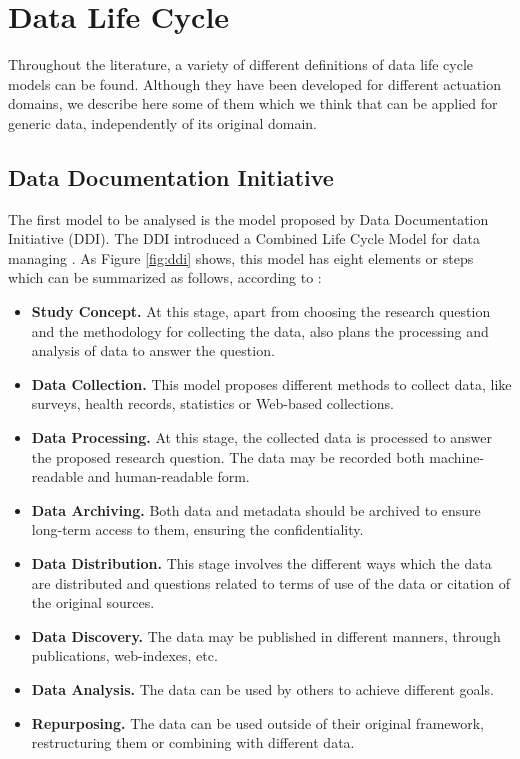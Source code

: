 \section{Data Life Cycle}

Throughout the literature, a variety of different definitions of data life cycle models can be found. Although they have been developed for different actuation domains, we describe here some of them which we think that can be applied for generic data, independently of its original domain.

\subsection{Data Documentation Initiative}

The first model to be analysed is the model proposed by Data Documentation Initiative (DDI). The DDI introduced a Combined Life Cycle Model for data managing \cite{data_documentation_initiative_overview_2008}. As Figure \ref{fig:ddi} shows, this model has eight elements or steps which can be summarized as follows, according to \cite{ball_review_2012}:

\begin{itemize}
    \item \textbf{Study Concept.} At this stage, apart from choosing the research question and the methodology for collecting the data, also plans the processing and analysis of data to answer the question.
    \item \textbf{Data Collection.} This model proposes different methods to collect data, like surveys, health records, statistics or Web-based collections.
    \item \textbf{Data Processing.} At this stage, the collected data is processed to answer the proposed research question. The data may be recorded both machine-readable and human-readable form.
    \item \textbf{Data Archiving.} Both data and metadata should be archived to ensure long-term access to them, ensuring the confidentiality.
    \item \textbf{Data Distribution.} This stage involves the different ways which the data are distributed and questions related to terms of use of the data or citation of the original sources. 
    \item \textbf{Data Discovery.} The data may be published in different manners, through publications, web-indexes, etc.
    \item \textbf{Data Analysis.} The data can be used by others to achieve different goals.
    \item \textbf{Repurposing.} The data can be used outside of their original framework, restructuring them or combining with different data.
\end{itemize}

